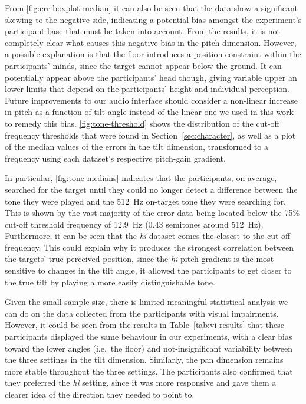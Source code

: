 \documentclass[sigconf, review=true, screen=true, anonymous=true]{acmart}
\begin{document}
From \cref{fig:err-boxplot-median} it can also be seen that the data show a significant skewing to the negative side, indicating a potential bias amongst the experiment's participant-base that must be taken into account.
From the results, it is not completely clear what causes this negative bias in the pitch dimension.
However, a possible explanation is that the floor introduces a position constraint within the participants' minds, since the target cannot appear below the ground.
It can potentially appear above the participants' head though, giving variable upper an lower limits that depend on the participants' height and individual perception.
Future improvements to our audio interface should consider a non-linear increase in pitch as a function of tilt angle instead of the linear one we used in this work to remedy this bias.
\cref{fig:tone-threshold} shows the distribution of the cut-off frequency thresholds that were found in Section~\ref{sec:character}, as well as a plot of the median values of the errors in the tilt dimension, transformed to a frequency using each dataset's respective pitch-gain gradient. 

In particular, \cref{fig:tone-medians} indicates that the participants, on average, searched for the target until they could no longer detect a difference between the tone they were played and the \SI{512}{\hertz} on-target tone they were searching for.
This is shown by the vast majority of the error data being located below the 75\% cut-off threshold frequency of \SI{12.9}{\hertz} (0.43 semitones around \SI{512}{\hertz}).
Furthermore, it can be seen that the \emph{hi} dataset comes the closest to the cut-off frequency.
This could explain why it produces the strongest correlation between the targets' true perceived position, since the \emph{hi} pitch gradient is the most sensitive to changes in the tilt angle, it allowed the participants to get closer to the true tilt by playing a more easily distinguishable tone.

Given the small sample size, there is limited meaningful statistical analysis we can do on the data collected from the participants with visual impairments.
However, it could be seen from the results in Table~\ref{tab:vi-results} that these participants displayed the same behaviour in our experiments, with a clear bias toward the lower angles (i.e.\ the floor) and not-insignificant variability between the three settings in the tilt dimension.
Similarly, the pan dimension remains more stable throughout the three settings.
The participants also confirmed that they preferred the \emph{hi} setting, since it was more responsive and gave them a clearer idea of the direction they needed to point to. 
\end{document}
